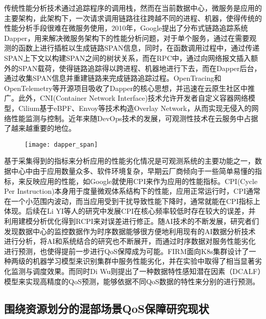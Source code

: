 传统性能分析技术通过追踪程序的调用栈，然而在当前数据中心，微服务是应用的主要架构，此架构下，一次请求调用链路往往跨越不同的进程、机器，使得传统的性能分析手段很难在微服务使用，2010年，Google提出了分布式链路追踪系统Dapper\citep{sigelman2010dapper}，用来解决微服务架构下的性能分析问题，对于单个服务，通过在需要观测的函数上进行插桩以生成链路SPAN信息，同时，在函数调用过程中，通过传递SPAN上下文以构建SPAN之间的树状关系，而在RPC中，通过向网络报文插入额外的SPAN载荷，使得链路追踪得以跨进程、机器地进行下去，而在Dapper后台，通过收集SPAN信息并重建链路来完成链路追踪过程。OpenTracing和OpenTelemetry等开源项目吸收了Dapper的核心思想，并迅速在云原生社区中推广。此外，CNI(Container Network Interface)\citep{k8s-network-plugins}技术允许开发者自定义容器网络模型，Cilium\citep{cilium}基于eBPF、Envoy等技术\citep{ebpf,envoyproxy}构造Overlay Network，从而实现无侵入的网络性能监测与控制。近年来随DevOps技术的发展，可观测性技术在云服务中占据了越来越重要的地位。

\begin{figure}[H]
    \centering
    \texttt{[image: dapper\_span]}
    \label{fig:parties_app_dif}
\end{figure}

基于采集得到的指标来分析应用的性能劣化情况是可观测系统的主要功能之一，数据中心中由于应用数量众多、软件环境复杂，早期云厂商倾向于一些简单易懂的指标，来反映应用的性能，如Google就使用CPI\citep{zhang2013cpi2}来作为应用的性能指标。CPI(Cycle Per Instruction)本身用于度量微观体系结构下的性能，应用正常运行时，CPI通常在一个小范围内波动，而当应用受到干扰导致性能下降时，通常就能在CPI指标上体现。后续在Li YI等人的研究中\citep{yi2020cpi}发展CPI在核心频率较低时存在较大的误差，并利用建模分析优化得到RCPI来对误差进行修正。随AI技术的不断发展，研究者们发现数据中心的监控数据作为时序数据能够很方便地利用现有的AI数据分析技术进行分析，将AI和系统结合的研究也不断展开，而通过时序数据对服务性能劣化进行预测\citep{qiu2020firm, zhou2022aquatope, wang2022deepscaling, gan2021sage, ghafouri2020survey,zheng2020web,wu2019posterior}，也使得提前一步进行QoS保障成为可能。FIRM\citep{qiu2020firm}面向K8s集群设计了一种两级的机器学习模型来识别集群中服务性能劣化，并在实验中取得了相当显著劣化监测与调度效果。而同时Di Wu\citep{wu2020data}则提出了一种数据特性感知潜在因素（DCALF）模型来实现高精度的QoS预测，能够依据不同QoS数据的特性来分别的进行预测。

\subsection{围绕资源划分的混部场景QoS保障研究现状}

